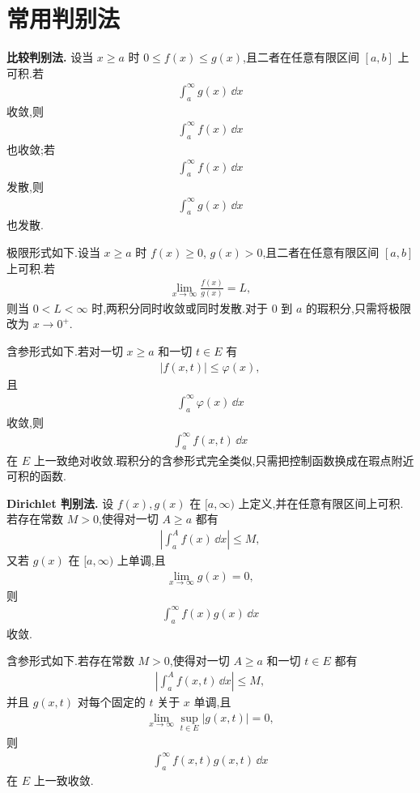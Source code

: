 \section{常用判别法}

\textbf{比较判别法.}
设当 $x\geq a$ 时 $0\leq f(x)\leq g(x)$,且二者在任意有限区间 $[a,b]$ 上可积.若
\begin{align*}
	\int_a^\infty g(x)\,\dd x
\end{align*}
收敛,则
\begin{align*}
	\int_a^\infty f(x)\,\dd x
\end{align*}
也收敛;若
\begin{align*}
	\int_a^\infty f(x)\,\dd x
\end{align*}
发散,则
\begin{align*}
	\int_a^\infty g(x)\,\dd x
\end{align*}
也发散.

极限形式如下.设当 $x\geq a$ 时 $f(x)\geq0$, $g(x)>0$,且二者在任意有限区间 $[a,b]$ 上可积.若
\begin{align*}
	\lim_{x\to\infty}\frac{f(x)}{g(x)}=L,
\end{align*}
则当 $0<L<\infty$ 时,两积分同时收敛或同时发散.对于 $0$ 到 $a$ 的瑕积分,只需将极限改为 $x\to0^+$.

含参形式如下.若对一切 $x\geq a$ 和一切 $t\in E$ 有
\begin{align*}
	|f(x,t)|\leq \varphi(x),
\end{align*}
且
\begin{align*}
	\int_a^\infty \varphi(x)\,\dd x
\end{align*}
收敛,则
\begin{align*}
	\int_a^\infty f(x,t)\,\dd x
\end{align*}
在 $E$ 上一致绝对收敛.瑕积分的含参形式完全类似,只需把控制函数换成在瑕点附近可积的函数.

\textbf{Dirichlet 判别法.}
设 $f(x),g(x)$ 在 $[a,\infty)$ 上定义,并在任意有限区间上可积.若存在常数 $M>0$,使得对一切 $A\geq a$ 都有
\begin{align*}
	\left|\int_a^A f(x)\,\dd x\right|\leq M,
\end{align*}
又若 $g(x)$ 在 $[a,\infty)$ 上单调,且
\begin{align*}
	\lim_{x\to\infty}g(x)=0,
\end{align*}
则
\begin{align*}
	\int_a^\infty f(x)g(x)\,\dd x
\end{align*}
收敛.

含参形式如下.若存在常数 $M>0$,使得对一切 $A\geq a$ 和一切 $t\in E$ 都有
\begin{align*}
	\left|\int_a^A f(x,t)\,\dd x\right|\leq M,
\end{align*}
并且 $g(x,t)$ 对每个固定的 $t$ 关于 $x$ 单调,且
\begin{align*}
	\lim_{x\to\infty}\sup_{t\in E}|g(x,t)|=0,
\end{align*}
则
\begin{align*}
	\int_a^\infty f(x,t)g(x,t)\,\dd x
\end{align*}
在 $E$ 上一致收敛.

